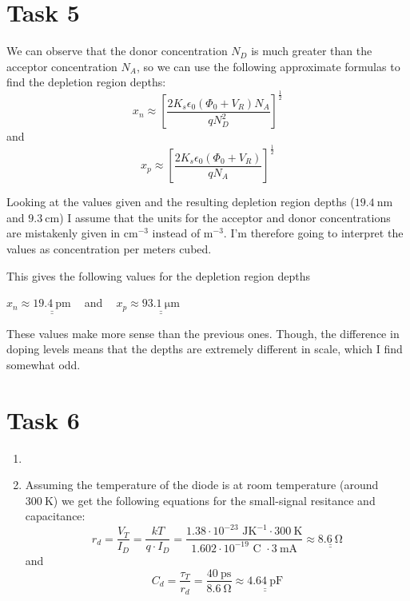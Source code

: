 \documentclass[a4paper,11pt,norsk]{article}
\begin{document}
\section*{Task 5}
We can observe that the donor concentration $N_D$ is much greater than the acceptor concentration $N_A$, so we can use the 
following approximate formulas to find the depletion region depths:
\[
    x_n \approx \left[\frac{2K_s \epsilon_0 (\Phi_0 + V_R)N_A}{qN_D^2}\right]^{\frac{1}{2}}
\]
and
\[
    x_p \approx \left[\frac{2K_s \epsilon_0 (\Phi_0 + V_R)}{qN_A}\right]^{\frac{1}{2}}
\]

Looking at the values given and the resulting depletion region depths ($\SI{19.4}{\nano\meter}$ and $\SI{9.3}{\centi\meter}$) I assume that the units for the acceptor and donor concentrations are 
mistakenly given in $\text{cm}^{-3}$ instead of $\text{m}^{-3}$. I'm therefore going to interpret the values as concentration per meters cubed.

This gives the following values for the depletion region depths
\begin{center}
    $x_n \approx \underline{\underline{\SI{19.4}{\pico\meter}}}\:\:\:\:$ and $\:\:\:\:x_p \approx \underline{\underline{\SI{93.1}{\micro\meter}}}$
\end{center}

These values make more sense than the previous ones. Though, the difference in doping levels means that the depths are extremely different in scale, which I find somewhat odd.

\section*{Task 6}
\begin{enumerate}
\item  
\item Assuming the temperature of the diode is at room temperature (around $\SI{300}{\kelvin}$) we get the following equations for the 
small-signal resitance and capacitance:
\[
    r_d = \frac{V_T}{I_D} = \frac{kT}{q \cdot I_D} = \frac{1.38 \cdot 10^{-23} \text{ JK}^{-1} \cdot \SI{300}{\kelvin}}{1.602 \cdot 10^{-19} \text{ C } \cdot \SI{3}{\milli\ampere}} \approx \underline{\underline{\SI{8.6}{\ohm}}}
\]
and
\[
    C_d = \frac{\tau_T}{r_d} = \frac{\SI{40}{\pico\s}}{\SI{8.6}{\ohm}} \approx \underline{\underline{\SI{4.64}{\pico\farad}}}
\]
\end{enumerate}
\end{document}
